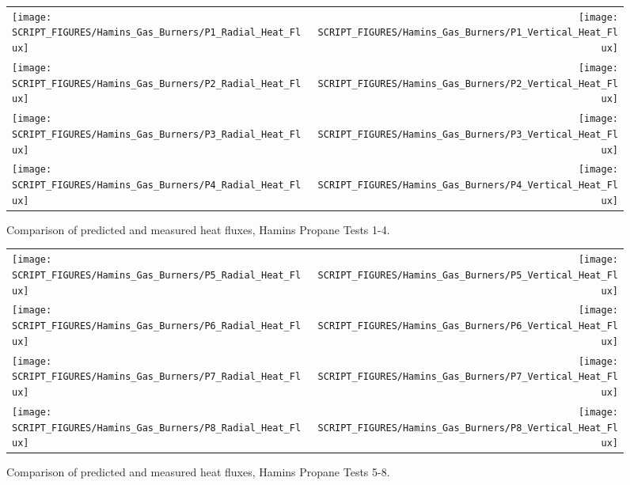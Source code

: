 \begin{figure}[p]
\begin{tabular*}{\textwidth}{l@{\extracolsep{\fill}}r}
\texttt{[image: SCRIPT\_FIGURES/Hamins\_Gas\_Burners/P1\_Radial\_Heat\_Flux]} &
\texttt{[image: SCRIPT\_FIGURES/Hamins\_Gas\_Burners/P1\_Vertical\_Heat\_Flux]} \\
\texttt{[image: SCRIPT\_FIGURES/Hamins\_Gas\_Burners/P2\_Radial\_Heat\_Flux]} &
\texttt{[image: SCRIPT\_FIGURES/Hamins\_Gas\_Burners/P2\_Vertical\_Heat\_Flux]} \\
\texttt{[image: SCRIPT\_FIGURES/Hamins\_Gas\_Burners/P3\_Radial\_Heat\_Flux]} &
\texttt{[image: SCRIPT\_FIGURES/Hamins\_Gas\_Burners/P3\_Vertical\_Heat\_Flux]} \\
\texttt{[image: SCRIPT\_FIGURES/Hamins\_Gas\_Burners/P4\_Radial\_Heat\_Flux]} &
\texttt{[image: SCRIPT\_FIGURES/Hamins\_Gas\_Burners/P4\_Vertical\_Heat\_Flux]}
\end{tabular*}
\label{Hamins_Propane_1-4}
\caption[Heat flux predictions, Hamins propane burner Tests 1-4]
{Comparison of predicted and measured heat fluxes, Hamins Propane Tests 1-4.}
\end{figure}

\begin{figure}[p]
\begin{tabular*}{\textwidth}{l@{\extracolsep{\fill}}r}
\texttt{[image: SCRIPT\_FIGURES/Hamins\_Gas\_Burners/P5\_Radial\_Heat\_Flux]} &
\texttt{[image: SCRIPT\_FIGURES/Hamins\_Gas\_Burners/P5\_Vertical\_Heat\_Flux]} \\
\texttt{[image: SCRIPT\_FIGURES/Hamins\_Gas\_Burners/P6\_Radial\_Heat\_Flux]} &
\texttt{[image: SCRIPT\_FIGURES/Hamins\_Gas\_Burners/P6\_Vertical\_Heat\_Flux]} \\
\texttt{[image: SCRIPT\_FIGURES/Hamins\_Gas\_Burners/P7\_Radial\_Heat\_Flux]} &
\texttt{[image: SCRIPT\_FIGURES/Hamins\_Gas\_Burners/P7\_Vertical\_Heat\_Flux]} \\
\texttt{[image: SCRIPT\_FIGURES/Hamins\_Gas\_Burners/P8\_Radial\_Heat\_Flux]} &
\texttt{[image: SCRIPT\_FIGURES/Hamins\_Gas\_Burners/P8\_Vertical\_Heat\_Flux]}
\end{tabular*}
\label{Hamins_Propane_5-8}
\caption[Heat flux predictions, Hamins propane burner Tests 5-8]
{Comparison of predicted and measured heat fluxes, Hamins Propane Tests 5-8.}
\end{figure}

